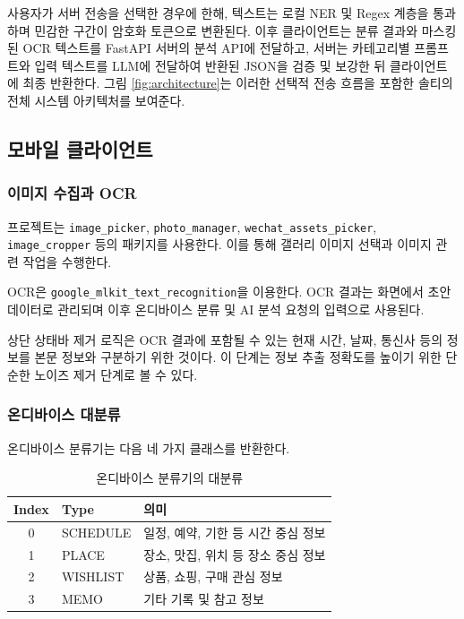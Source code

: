 \documentclass[11pt,a4paper]{article}
\begin{document}
사용자가 서버 전송을 선택한 경우에 한해, 텍스트는 로컬 NER 및 Regex 계층을 통과하며 민감한 구간이 암호화 토큰으로 변환된다. 이후 클라이언트는 분류 결과와 마스킹된 OCR 텍스트를 FastAPI 서버의 분석 API에 전달하고, 서버는 카테고리별 프롬프트와 입력 텍스트를 LLM에 전달하여 반환된 JSON을 검증 및 보강한 뒤 클라이언트에 최종 반환한다. 그림 \ref{fig:architecture}는 이러한 선택적 전송 흐름을 포함한 솔티의 전체 시스템 아키텍처를 보여준다.

\subsection{모바일 클라이언트}

\subsubsection{이미지 수집과 OCR}

프로젝트는 \texttt{image\_picker}, \texttt{photo\_manager}, \texttt{wechat\_assets\_picker}, \texttt{image\_cropper} 등의 패키지를 사용한다. 이를 통해 갤러리 이미지 선택과 이미지 관련 작업을 수행한다.

OCR은 \texttt{google\_mlkit\_text\_recognition}을 이용한다. OCR 결과는 화면에서 초안 데이터로 관리되며 이후 온디바이스 분류 및 AI 분석 요청의 입력으로 사용된다.

상단 상태바 제거 로직은 OCR 결과에 포함될 수 있는 현재 시간, 날짜, 통신사 등의 정보를 본문 정보와 구분하기 위한 것이다. 이 단계는 정보 추출 정확도를 높이기 위한 단순한 노이즈 제거 단계로 볼 수 있다.

\subsubsection{온디바이스 대분류}

온디바이스 분류기는 다음 네 가지 클래스를 반환한다.

\begin{table}[H]
\centering
\begin{tabularx}{0.8\linewidth}{c l Y}
\toprule
\textbf{Index} & \textbf{Type} & \textbf{의미}\\
 & SCHEDULE & 일정, 예약, 기한 등 시간 중심 정보\\
1 & PLACE & 장소, 맛집, 위치 등 장소 중심 정보\\
2 & WISHLIST & 상품, 쇼핑, 구매 관심 정보\\
3 & MEMO & 기타 기록 및 참고 정보\\
\bottomrule
\end{tabularx}
\caption{온디바이스 분류기의 대분류}
\end{table}
\end{document}
